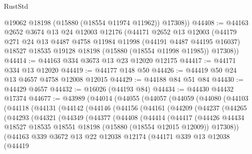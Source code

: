 \begin{lexlean}{RustStd}
\begin{coremodule}
        @19062
        @18198
        (@15880 (@18554 @11974 @11962))
        @17308))
@44408 := @44163
    @2652
    @3674
    @13
    @24
    @12003
    @12176
    (@44171
      @2652
      @13
      @12003
      (@44179
        @271
        @24
        @13
        @4487
        @4758
        @11984
        @11998
        (@44191 @4487 @44195 @16037)
        @18527
        @18535
        @19128
        @18198
        (@15880 (@18554 @11998 @11985))
        @17308))
@44414 := @44163 @334 @3673 @13 @23 @12020 @12175
@44417 := @44171 @334 @13 @12020
@44419 := @44177 @148 @50
@44426 := @44419 @50 @24 @13 @4657 @4758 @12008 @12015
@44429 := @44188 @84 @51 @84
@44430 := @44429 @4657
@44432 := @16026 (@44193 @84)
@44434 := @44430 @44432 @17374
@44677 := @43989
    (@44014
      (@44055
        (@44057
          (@44059
            (@44080
              (@44103
                (@44118
                  (@44131
                    (@44142
                      (@44146
                        (@44156
                          (@44161
                            (@44209
                              (@44237
                                (@44265
                                  (@44293
                                    (@44321
                                      (@44349
                                        (@44377
                                          (@44408
                                            (@44414
                                              (@44417
                                                (@44426
                                                  @44434
                                                  @18527
                                                  @18535
                                                  @18551
                                                  @18198
                                                  (@15880 (@18554 @12015 @12009))
                                                  @17308))
                                              (@44163
                                                @339
                                                @3672
                                                @13
                                                @22
                                                @12038
                                                @12174
                                                (@44171
                                                  @339
                                                  @13
                                                  @12038
                                                  (@44419

\end{coremodule}
\end{lexlean}
